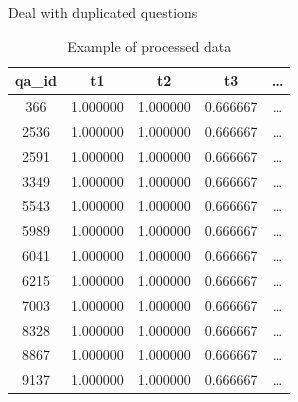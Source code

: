 \documentclass[
 size=12pt,
 paper=smartboard, %
 mode=present, %
 display=slides, %
style=tuliplab,
pauseslide,
fleqn,leqno]{powerdot}
\begin{document}
\begin{slide}{Deal with duplicated questions}
{\begin{table}
        \end{table}
    }{
        \begin{table}
            \centering
            \caption{Example of processed data}
            \label{tbl:dp_after}
            \begin{tabular}{ccccc}
                \hline
                qa_id	&t1 &t2 &t3 &\dots\\
                \hline
                366	    &1.000000	&1.000000	&0.666667&\dots\\
                2536	&1.000000	&1.000000	&0.666667&\dots\\
                2591	&1.000000	&1.000000	&0.666667&\dots\\
                3349	&1.000000	&1.000000	&0.666667&\dots\\
                5543	&1.000000	&1.000000	&0.666667&\dots\\
                5989	&1.000000	&1.000000	&0.666667&\dots\\
                6041	&1.000000	&1.000000	&0.666667&\dots\\
                6215	&1.000000	&1.000000	&0.666667&\dots\\
                7003	&1.000000	&1.000000	&0.666667&\dots\\
                8328	&1.000000	&1.000000	&0.666667&\dots\\
                8867	&1.000000	&1.000000	&0.666667&\dots\\
                9137	&1.000000	&1.000000	&0.666667&\dots\\
                \hline
            \end{tabular}
        \end{table}
    }
\end{slide}
\end{document}
